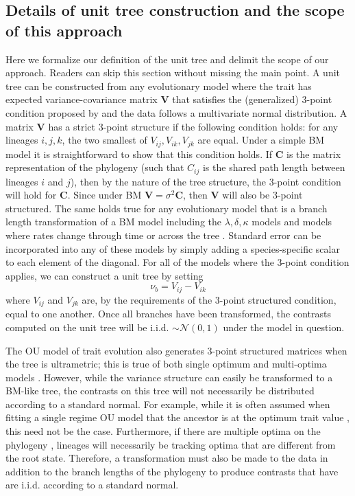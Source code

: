 \subsection{Details of unit tree construction and the scope of this approach}

Here we formalize our definition of the unit tree and delimit the scope of our approach. Readers can skip this section without missing the main point. A unit tree can be constructed from any evolutionary model where the trait has expected variance-covariance matrix $\mathbf{V}$ that satisfies the (generalized) 3-point condition proposed by \citet{Ho2014} and the data follows a multivariate normal distribution. A matrix $\mathbf{V}$ has a strict 3-point structure if the following condition holds: for any lineages $i,j,k$, the two smallest of $V_{ij}, V_{ik}, V_{jk}$ are equal. Under a simple BM model it is straightforward to show that this condition holds. If $\mathbf{C}$ is the matrix representation of the phylogeny (such that $C_{ij}$ is the shared path length between lineages $i$ and $j$), then by the nature of the tree structure, the 3-point condition will hold for $\mathbf{C}$. Since under BM $\mathbf{V}=\sigma^2\mathbf{C}$, then $\mathbf{V}$ will also be 3-point structured. The same holds true for any evolutionary model that is a branch length transformation of a BM model including the $\lambda, \delta, \kappa$ models \citep{Pagel1997,Pagel1999} and models where rates change through time \citep[the ``Early Burst'' or EB model, also referred to as the Accelerating/Decelerating Change, ACDC, model;][]{Blomberg2003, Harmon2010} or across the tree \citep{Omeara2006, Thomas2006, Eastman2011, Revell2012, motmot}. Standard error can be incorporated into any of these models by simply adding a species-specific scalar to each element of the diagonal. For all of the models where the 3-point condition applies, we can construct a unit tree by setting
\begin{equation}\label{eq:ut}
\nu_{b} = V_{ij} - V_{ik}
\end{equation}
where $V_{ij}$ and $V_{jk}$ are, by the requirements of the 3-point structured condition, equal to one another. Once all branches have been transformed, the contrasts computed on the unit tree will be i.i.d. $\sim \mathcal{N}(0,1)$ under the model in question. 

The OU model of trait evolution also generates 3-point structured matrices when the tree is ultrametric; this is true of both single optimum and multi-optima models \citep{Ho2014}.
However, while the variance structure can easily be transformed to a BM-like tree, the contrasts on this tree will not necessarily be distributed according to a standard normal. For example, while it is often assumed when fitting a single regime OU model that the ancestor is at the optimum trait value \citep[see, for example][]{Harmon2010}, this need not be the case. Furthermore, if there are multiple optima on the phylogeny \citep{Hansen1997, ButlerKing2004, IngramMahler2013, UyedaBayou}, lineages will necessarily be tracking optima that are different from the root state. Therefore, a transformation must also be made to the data in addition to the branch lengths of the phylogeny to produce contrasts that have are i.i.d. according to a standard normal.

